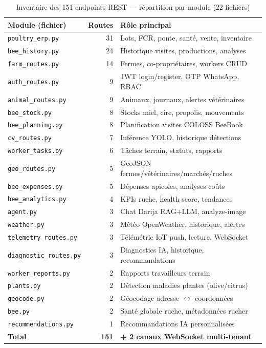 \documentclass[12pt,a4paper,twoside]{report}
\newcommand{\code}[1]{\texttt{#1}}
\newcounter{hi}
\begin{document}
\begin{table}[H]
\centering
\caption{Inventaire des 151 endpoints REST — répartition par module (22 fichiers)}
\label{tab:api_endpoints}
\begin{tabular}{lrl}
\toprule
\textbf{Module (fichier)} & \textbf{Routes} & \textbf{Rôle principal} \\
\midrule
\code{poultry\_erp.py}   & 31 & Lots, FCR, ponte, santé, vente, inventaire \\
\code{bee\_history.py}   & 24 & Historique visites, productions, analyses \\
\code{farm\_routes.py}   & 14 & Fermes, co-propriétaires, workers CRUD \\
\code{auth\_routes.py}   &  9 & JWT login/register, OTP WhatsApp, RBAC \\
\code{animal\_routes.py} &  9 & Animaux, journaux, alertes vétérinaires \\
\code{bee\_stock.py}     &  8 & Stocks miel, cire, propolis, mouvements \\
\code{bee\_planning.py}  &  8 & Planification visites COLOSS BeeBook \\
\code{cv\_routes.py}     &  7 & Inférence YOLO, historique détections \\
\code{worker\_tasks.py}  &  6 & Tâches terrain, statuts, rapports \\
\code{geo\_routes.py}    &  5 & GeoJSON fermes/vétérinaires/marchés/ruches \\
\code{bee\_expenses.py}  &  5 & Dépenses apicoles, analyses coûts \\
\code{bee\_analytics.py} &  4 & KPIs ruche, health score, tendances \\
\code{agent.py}          &  3 & Chat Darija RAG+LLM, analyze-image \\
\code{weather.py}        &  3 & Météo OpenWeather, historique, alertes \\
\code{telemetry\_routes.py} & 3 & Télémétrie IoT push, lecture, WebSocket \\
\code{diagnostic\_routes.py}& 3 & Diagnostics IA, historique, recommandations \\
\code{worker\_reports.py}&  2 & Rapports travailleurs terrain \\
\code{plants.py}         &  2 & Détection maladies plantes (olive/citrus) \\
\code{geocode.py}        &  2 & Géocodage adresse $\leftrightarrow$ coordonnées \\
\code{bee.py}            &  2 & Santé globale ruche, métadonnées rucher \\
\code{recommendations.py}&  1 & Recommandations IA personnalisées \\
\midrule
\textbf{Total}           & \textbf{151} & \textbf{+ 2 canaux WebSocket multi-tenant} \\
\bottomrule
\end{tabular}
\end{table}
\end{document}
